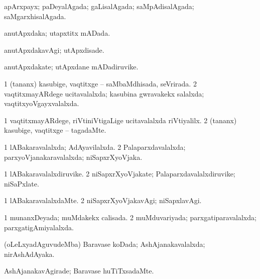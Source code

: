 \bentry
{} 
\gl{\gu}
\expl{}
\bmng
apArxpayx; paDeyalAgada; gaLisalAgada; saMpAdisalAgada; saMgarxhisalAgada. 
\emng
\eentry

\bentry
{} 
\gl{\gu}
\expl{}
\bmng
anutApxdaka; utapxtitx mADada. 
\emng
\eentry

\bentry
{} 
\gl{\kirxvi}
\expl{}
\bmng
anutApxdakavAgi; utApxdisade. 
\emng
\eentry

\bentry
{} 
\gl{\nA}
\expl{}
\bmng
anutApxdakate; utApxdane mADadiruvike. 
\emng
\eentry

\bentry
{} 
\gl{\gu}
\expl{}
\bmng
\bnum
\num{1} (tananx) kasubige, vaqtitxge -- saMbaMdhisada, seVrirada. 
\num{2} vaqtitxmayARdege ucitavalalxda; kasubina gwravakekx salalxda; vaqtitxyoVgayxvalalxda. 
\enum
\emng
\eentry

\bentry
{} 
\gl{\kirxvi}
\expl{}
\bmng
\bnum
\num{1} vaqtitxmayARdege, riVtiniVtigaLige ucitavalalxda riVtiyalilx. 
\num{2} (tananx) kasubige, vaqtitxge -- tagadaMte. 
\enum
\emng
\eentry

\bentry
{} 
\gl{\gu}
\expl{}
\bmng
\bnum
\num{1} lABakaravalalxda; AdAyavilalxda. 
\num{2} Palaparxdavalalxda; parxyoVjanakaravalalxda; niSapxrXyoVjaka. 
\enum
\emng
\eentry

\bentry
{} 
\gl{\nA}
\expl{}
\bmng
\bnum
\num{1} lABakaravalalxdiruvike. 
\num{2} niSapxrXyoVjakate; Palaparxdavalalxdiruvike; niSaPxlate. 
\enum
\emng
\eentry

\bentry
{} 
\gl{\kirxvi}
\expl{}
\bmng
\bnum
\num{1} lABakaravalalxdaMte. 
\num{2} niSapxrXyoVjakavAgi; niSapxlavAgi. 
\enum
\emng
\eentry

\bentry
{} 
\gl{\gu}
\expl{}
\bmng
\bnum
\num{1} munanxDeyada; muMdakekx calisada. 
\num{2} muMduvariyada; parxgatiparavalalxda; parxgatigAmiyalalxda. 
\enum
\emng
\eentry

\bentry
{} 
\gl{\gu}
\expl{}
\bmng
(oLeLxyadAguvudeMba) Baravase koDada; AshAjanakavalalxda; nirAshAdAyaka. 
\emng
\eentry

\bentry
{} 
\gl{\kirxvi}
\expl{}
\bmng
AshAjanakavAgirade; Baravase huTiTxsadaMte. 
\emng
\eentry

